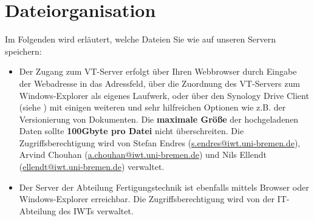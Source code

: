 \section{Dateiorganisation}\label{ssc:Dateiorganisation}
Im Folgenden wird erläutert, welche Dateien Sie wie auf unseren Servern
speichern:
\begin{itemize}
  \item Der Zugang zum VT-Server erfolgt über Ihren Webbrowser durch Eingabe der Webadresse
        in das Adressfeld, über die Zuordnung des VT-Servers zum
        Windows-Explorer als eigenes Laufwerk, oder über den Synology Drive
        Client (siehe \cite{synology2022}) mit einigen weiteren und sehr
        hilfreichen Optionen wie z.B. der Versionierung von Dokumenten.
        Die \textbf{maximale Größe} der hochgeladenen Daten sollte
        \textbf{100Gbyte pro Datei} nicht überschreiten. Die
        Zugriffsberechtigung wird von
        Stefan Endres (\href{mailto:s.endres@iwt.uni-bremen.de}%
                       {s.endres@iwt.uni-bremen.de}),
        Arvind Chouhan (\href{mailto:a.chouhan@iwt.uni-bremen.de}%
                        {a.chouhan@iwt.uni-bremen.de})
        und Nils Ellendt (\href{mailto:ellendt@iwt.uni-bremen.de}%
                          {ellendt@iwt.uni-bremen.de})
        verwaltet.
  \item Der Server der Abteilung Fertigungstechnik ist ebenfalls mittels
        Browser oder Windows-Explorer erreichbar. Die Zugriffsberechtigung wird von der
        IT-Abteilung des IWTs verwaltet.
\end{itemize}

